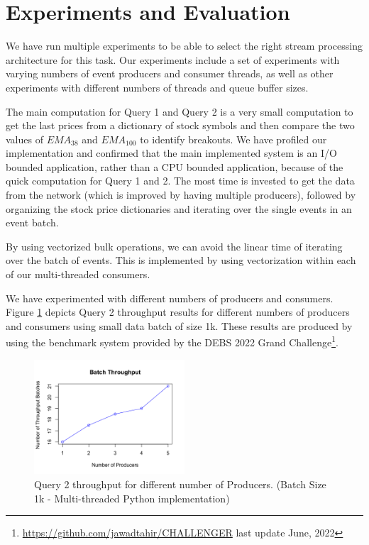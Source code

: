 \section{Experiments and Evaluation}\label{sec:experiments}

We have run multiple experiments to be able to select the right stream processing architecture for this task.
Our experiments include a set of experiments with varying numbers of event producers and consumer threads, as well as
other experiments with different numbers of threads and queue buffer sizes.

The main computation for Query 1 and Query 2 is a very small computation to get the last prices from a dictionary of stock symbols and then
compare the two values of $EMA_{38}$ and $EMA_{100}$ to identify breakouts. We have profiled our implementation and confirmed that the main implemented system
is an I/O bounded application, rather than a CPU bounded application, because of the quick computation for Query 1 and 2. The most time is
invested to get the data from the network (which is improved by having multiple producers), followed by organizing the stock price
dictionaries and iterating over the single events in an event batch.

By using vectorized bulk operations, we can avoid the linear time of iterating over the batch of events. This is implemented by using
vectorization within each of our multi-threaded consumers.

We have experimented with different numbers of producers and consumers.
Figure \ref{fig:evaluation} depicts Query 2 throughput results for different numbers of producers and consumers using small data batch of size 1k.
These results are produced by using the benchmark system provided by the DEBS 2022 Grand Challenge\footnote{\url{https://github.com/jawadtahir/CHALLENGER} last update June, 2022}.


\begin{figure}[]
    \begin{center}
        \includegraphics[width=0.5\textwidth]{./images/throughput.png}
        \caption{Query 2 throughput for different number of Producers. (Batch Size 1k - Multi-threaded Python implementation) }
        \label{fig:evaluation}
    \end{center}
\end{figure}


